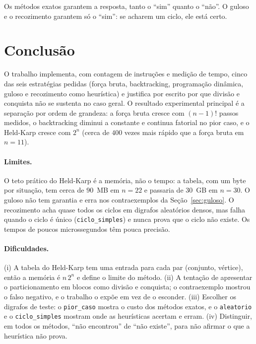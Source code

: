 \documentclass[12pt,a4paper]{article}
\begin{document}
Os métodos exatos garantem a resposta, tanto o ``sim'' quanto o ``não''. O guloso e o recozimento garantem só o ``sim'': se acharem um ciclo, ele está certo.

\section{Conclusão}

O trabalho implementa, com contagem de instruções e medição de tempo, cinco das seis estratégias pedidas (força bruta, backtracking, programação dinâmica, guloso e recozimento como heurística) e justifica por escrito por que divisão e conquista não se sustenta no caso geral. O resultado experimental principal é a separação por ordem de grandeza: a força bruta cresce com $(n-1)!$ passos medidos, o backtracking diminui a constante e continua fatorial no pior caso, e o Held-Karp cresce com $2^n$ (cerca de $400$ vezes mais rápido que a força bruta em $n=11$).

\paragraph{Limites.} O teto prático do Held-Karp é a memória, não o tempo: a tabela, com um byte por situação, tem cerca de $90$~MB em $n=22$ e passaria de $30$~GB em $n=30$. O guloso não tem garantia e erra nos contraexemplos da Seção~\ref{sec:guloso}. O recozimento acha quase todos os ciclos em digrafos aleatórios densos, mas falha quando o ciclo é único (\texttt{ciclo\_simples}) e nunca prova que o ciclo não existe. Os tempos de poucos microssegundos têm pouca precisão.

\paragraph{Dificuldades.} (i) A tabela do Held-Karp tem uma entrada para cada par (conjunto, vértice), então a memória é $n\,2^n$ e define o limite do método. (ii) A tentação de apresentar o particionamento em blocos como divisão e conquista; o contraexemplo mostrou o falso negativo, e o trabalho o expõe em vez de o esconder. (iii) Escolher os digrafos de teste: o \texttt{pior\_caso} mostra o custo dos métodos exatos, e o \texttt{aleatorio} e o \texttt{ciclo\_simples} mostram onde as heurísticas acertam e erram. (iv) Distinguir, em todos os métodos, ``não encontrou'' de ``não existe'', para não afirmar o que a heurística não prova.
\end{document}
